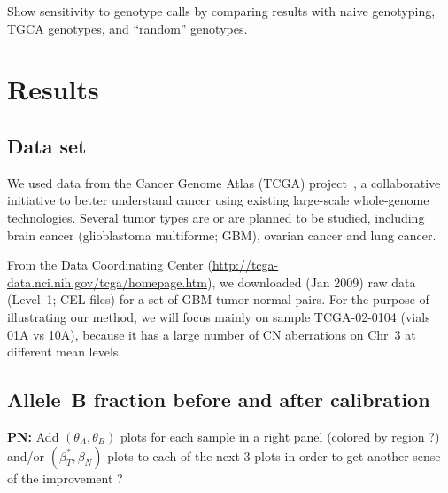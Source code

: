 \documentclass[10pt]{bmc_article}
\newenvironment{bmcformat}{\fussy\setboolean{publ}{true}}{\fussy}
\newenvironment{PN}{\color{blue}\textbf{PN:}}{}
\begin{document}
\begin{bmcformat}
Show sensitivity to genotype calls by comparing results with naive genotyping, TGCA genotypes, and ``random'' genotypes.

\section*{Results}
\label{secResults}

\subsection*{Data set}
We used data from the  Cancer Genome Atlas (TCGA) project~\cite{CollinsBarker_2007,TCGA_2008c}, a collaborative initiative to better understand cancer using existing large-scale whole-genome technologies.  Several tumor types are or are planned to be studied, including brain cancer (glioblastoma multiforme; GBM), ovarian cancer and lung cancer. 
 
From the Data Coordinating Center (\url{http://tcga-data.nci.nih.gov/tcga/homepage.htm}), we downloaded (Jan 2009) raw data (Level~1; CEL files) for a set of GBM tumor-normal pairs.
For the purpose of illustrating our method, we will focus mainly on sample TCGA-02-0104 (vials 01A vs 10A), because it has a large number of CN aberrations on Chr~3 at different mean levels.

\subsection*{Allele~B fraction before and after calibration}

\begin{PN}
  Add $(\theta_A, \theta_B)$ plots for each sample in a right panel (colored by region ?) and/or $(\beta_T^*, \beta_N)$ plots to each of the next 3 plots in order to get another sense of the improvement ?
\end{PN}


\end{bmcformat}
\end{document}
